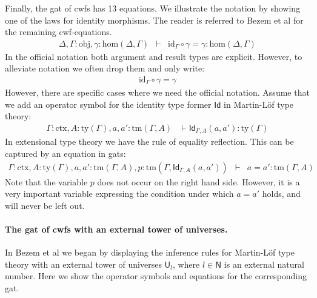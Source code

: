\documentclass[11pt,a4paper]{article}
\theoremstyle{definition}
\newcommand{\Id}{\mathsf{Id}}
\newcommand{\id}{\mathsf{id}}
\newcommand{\UU}{\mathsf{U}}
\def\UU{\mathsf{U}}
\newcommand{\N}{\mathsf{N}}
\def\Obj{\mathrm{obj}}
\def\Hom{\mathrm{hom}}
\def\id{\mathrm{id}}
\newcommand{\ctx}{\mathrm{ctx}}
\newcommand{\ty}{\mathrm{ty}}
\newcommand{\tm}{\mathrm{tm}}
\begin{document}
Finally, the gat of cwfs has 13 equations. We illustrate the notation by showing one of the laws for identity morphisms.  The reader is referred to Bezem et al \cite{bezem:hofmann} for the remaining cwf-equations.
\begin{eqnarray*}
\Delta, \Gamma : \Obj, \gamma : \Hom(\Delta,\Gamma) &\vdash& \id_\Gamma \circ \gamma = \gamma : \Hom(\Delta,\Gamma)
\end{eqnarray*}
In the official notation both argument and result types are explicit. However, to alleviate notation we often drop them and only write:
\begin{eqnarray*}
\id_\Gamma \circ \gamma = \gamma
\end{eqnarray*}
However, there are specific cases where we need the official notation. Assume that we add an operator symbol for the identity type former $\Id$ in Martin-Löf type theory:
\begin{eqnarray*}
\Gamma : \ctx, A : \ty(\Gamma), a, a' : \tm(\Gamma, A) &\vdash \Id_{\Gamma,A}(a,a'): \ty(\Gamma)
\end{eqnarray*}
In extensional type theory we have the rule of equality reflection. This can be captured by an equation in gats:
\begin{eqnarray*}
\Gamma : \ctx, A : \ty(\Gamma), a, a' : \tm(\Gamma, A),p :  \tm(\Gamma,\Id_{\Gamma,A}(a,a'))&\vdash& a = a' : \tm(\Gamma,A)
\end{eqnarray*}
Note that the variable $p$ does not occur on the right hand side.
However, it is a very important variable expressing
the condition under which $a=a'$ holds, and will never be left out.

\paragraph{The gat of cwfs with an external tower of universes.}
In Bezem et al \cite{BezemCDE22} we began by displaying the inference rules for Martin-Löf type theory with an external tower of universes $\UU_l$, where $l \in \N$ is an external natural number. Here we show the operator symbols and equations for the corresponding gat.
\end{document}
